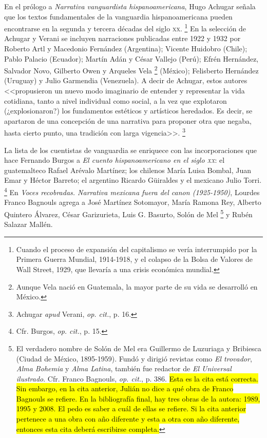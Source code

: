 \documentclass[14pt,twoside,final]{extbook} %
\let\oldfootnote\footnote
\renewcommand\footnote[1]{%
\oldfootnote{\hspace{1mm}#1}}
\begin{document}
En el prólogo a \emph{Narrativa vanguardista hispanoamericana}, Hugo Achugar señala que los textos fundamentales de la vanguardia hispanoamericana pueden encontrarse en la segunda y tercera décadas del siglo \textsc{xx}.\footnote{Cuando el proceso de expansión del capitalismo se vería interrumpido por la Primera Guerra Mundial, 1914-1918, y el colapso de la Bolsa de Valores de Wall Street, 1929, que llevaría a una crisis económica mundial.} En la selección de Achugar y Verani se incluyen narraciones publicadas entre 1922 y 1932 por Roberto Artl y Macedonio Fernández (Argentina); Vicente Huidobro (Chile); Pablo Palacio (Ecuador); Martín Adán y César Vallejo (Perú); Efrén Hernández, Salvador Novo, Gilberto Owen y Arqueles Vela\footnote{Aunque Vela nació en Guatemala, la mayor parte de su vida se desarrolló en México.} (México); Felisberto Hernández (Uruguay) y Julio Garmendia (Venezuela). A decir de Achugar, estos autores <<propusieron un nuevo modo imaginario de entender y representar la vida cotidiana, tanto a nivel individual como social, a la vez que explotaron (¿explosionaron?) los fundamentos estéticos y artísticos heredados. Es decir, se apartaron de una concepción de una narrativa para proponer otra que negaba, hasta cierto punto, una tradición con larga vigencia>>.\footnote{Achugar \emph{apud} Verani, \emph{op. cit.}, p. 16.}

La lista de los cuentistas de vanguardia se enriquece con las incorporaciones que hace Fernando Burgos a \emph{El cuento hispanoamericano en el siglo \textsc{xx}}: el guatemalteco Rafael Arévalo Martínez; los chilenos María Luisa Bombal, Juan Emar y Héctor Barreto; el argentino Ricardo Güiraldes y el mexicano Julio Torri.\footnote{Cfr. Burgos, \emph{op. cit.}, p. 15.} En \emph{Voces recobradas. Narrativa mexicana fuera del canon (1925-1950)}, Lourdes Franco Bagnouls agrega a José Martínez Sotomayor, María Ramona Rey, Alberto Quintero Álvarez, César Garizurieta, Luis G. Basurto, Solón de Mel\footnote{El verdadero nombre de Solón de Mel era Guillermo de Luzuriaga y Bribiesca (Ciudad de México, 1895-1959). Fundó y dirigió revistas como \emph{El trovador}, \emph{Alma Bohemia} y \emph{Alma Latina}, también fue redactor de \emph{El Universal ilustrado}. Cfr. Franco Bagnouls, \emph{op. cit.}, p. 386. \hl{Esta es la cita está correcta. Sin embargo, en la cita anterior, Julián no dice a qué obra de Franco Bagnouls se refiere. En la bibliografía final, hay tres obras de la autora: 1989, 1995 y 2008. El pedo es saber a cuál de ellas se refiere. Si la cita anterior pertenece a una obra con año diferente y esta a otra con año diferente, entonces esta cita deberá escribirse completa.}} y Rubén Salazar Mallén.
\end{document}
